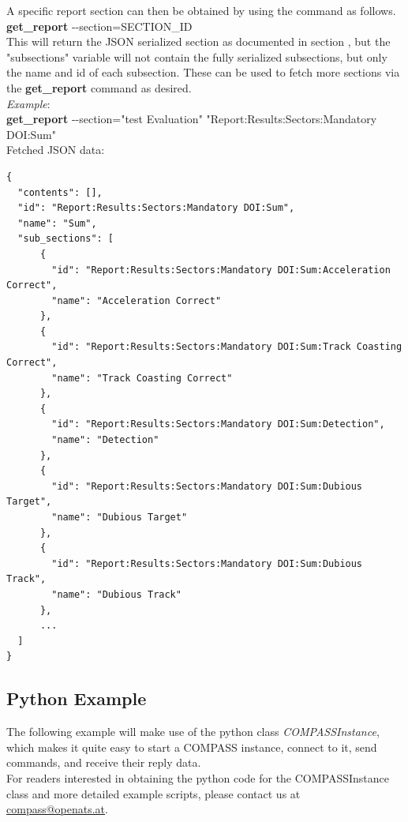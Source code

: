 A specific report section can then be obtained by using the command as follows. \\

\textbf{get\_report} -{}-section=SECTION\_ID \\

This will return the JSON serialized section as documented in section ,
but the "subsections" variable will not contain the fully serialized subsections,
but only the name and id of each subsection. These can be used to fetch more sections 
via the \textbf{get\_report} command as desired. \\

\textit{Example}: \\

\textbf{get\_report} -{}-section="test Evaluation" "Report:Results:Sectors:Mandatory DOI:Sum" \\

Fetched JSON data: \\

\begin{lstlisting}[basicstyle=\tiny\ttfamily]
{
  "contents": [],
  "id": "Report:Results:Sectors:Mandatory DOI:Sum",
  "name": "Sum",
  "sub_sections": [
      {
        "id": "Report:Results:Sectors:Mandatory DOI:Sum:Acceleration Correct",
        "name": "Acceleration Correct"
      },
      {
        "id": "Report:Results:Sectors:Mandatory DOI:Sum:Track Coasting Correct",
        "name": "Track Coasting Correct"
      },
      {
        "id": "Report:Results:Sectors:Mandatory DOI:Sum:Detection",
        "name": "Detection"
      },
      {
        "id": "Report:Results:Sectors:Mandatory DOI:Sum:Dubious Target",
        "name": "Dubious Target"
      },
      {
        "id": "Report:Results:Sectors:Mandatory DOI:Sum:Dubious Track",
        "name": "Dubious Track"
      },
      ...
  ]
}
\end{lstlisting}

\subsection{Python Example}

The following example will make use of the python class \textit{COMPASSInstance}, 
which makes it quite easy to start a COMPASS instance, connect to it, send commands,
and receive their reply data. \\

For readers interested in obtaining the python code for the COMPASSInstance class and 
more detailed example scripts, please contact us at \href{mailto:compass@openats.at}{compass@openats.at}. \\

